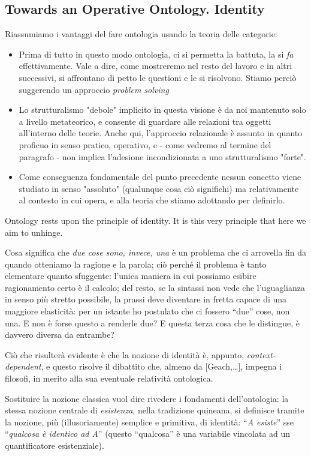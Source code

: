 \documentclass[a4paper, 11pt]{article}
\begin{document}
	
	\subsection{Towards an Operative Ontology. Identity}
	
	Riassumiamo i vantaggi del fare ontologia usando la teoria delle categorie:
	\begin{itemize}
		\item Prima di tutto in questo modo ontologia, ci si permetta la battuta, la si \emph{fa} effettivamente. Vale a dire, come mostreremo nel resto del lavoro e in altri successivi, si affrontano di petto le questioni e le si risolvono. Stiamo perciò suggerendo un approccio \emph{problem solving}
		\item Lo strutturalismo "debole" implicito in questa visione è da noi mantenuto solo a livello metateorico, e consente di guardare alle relazioni tra oggetti all'interno delle teorie. Anche qui, l'approccio relazionale è assunto in quanto proficuo in senso pratico, operativo, e - come vedremo al termine del paragrafo - non implica l'adesione incondizionata a uno strutturalismo "forte".
		\item Come conseguenza fondamentale del punto precedente nessun concetto viene studiato in senso "assoluto" (qualunque cosa ciò significhi) ma relativamente al contesto in cui opera, e alla teoria che stiamo adottando per definirlo.  
	\end{itemize}
	Ontology rests upon the principle of identity. It is this very principle that here we aim to unhinge.
	
	Cosa significa che \emph{due cose sono, invece, una} è un problema che ci arrovella fin da quando otteniamo la ragione e la parola; ciò perché il problema è tanto elementare quanto sfuggente: l'unica maniera in cui possiamo esibire ragionamento certo è il calcolo; del resto, se la sintassi non vede che l'uguaglianza in senso più stretto possibile, la prassi deve diventare in fretta capace di una maggiore elasticità: per un istante ho postulato che ci fossero ``due'' cose, non una. E non è forse questo a renderle due? E questa terza cosa che le distingue, è davvero diversa da entrambe?
	
	Ciò che risulterà evidente è che la nozione di identità è, appunto, \emph{context-dependent}, e questo risolve il dibattito che, almeno da [Geach,\dots], impegna i filosofi, in merito alla sua eventuale relatività ontologica. 
	
	Sostituire la nozione classica vuol dire rivedere i fondamenti dell'ontologia: la stessa nozione centrale di \emph{esistenza}, nella tradizione quineana, si definisce tramite la nozione, più (illusoriamente) semplice e primitiva, di identità: ``\textit{A esiste}'' sse ``\textit{qualcosa è identico ad A}'' (questo ``qualcosa'' è una variabile vincolata ad un quantificatore esistenziale).
	
\end{document}
